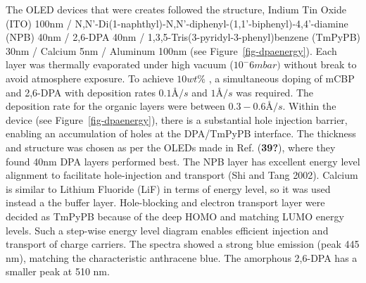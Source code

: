 \documentclass[
  letterpaper,
  DIV=11,
  numbers=noendperiod,
  oneside]{scrreprt}
\begin{document}
The OLED devices that were creates followed the structure, Indium Tin
Oxide (ITO) 100nm /
N,N'-Di(1-naphthyl)-N,N'-diphenyl-(1,1'-biphenyl)-4,4'-diamine (NPB)
40nm / 2,6-DPA 40nm / 1,3,5-Tris(3-pyridyl-3-phenyl)benzene (TmPyPB)
30nm / Calcium 5nm / Aluminum 100nm (see Figure~\ref{fig-dpaenergy}).
Each layer was thermally evaporated under high vacuum (\(10^-6 mbar)\)
without break to avoid atmosphere exposure. To achieve \(10wt\%\) , a
simultaneous doping of mCBP and 2,6-DPA with deposition rates \(0.1Å/s\)
and \(1Å/s\) was required. The deposition rate for the organic layers
were between \(0.3 - 0.6Å/s\). Within the device (see
Figure~\ref{fig-dpaenergy}), there is a substantial hole injection
barrier, enabling an accumulation of holes at the DPA/TmPyPB interface.
The thickness and structure was chosen as per the OLEDs made in Ref.
(\textbf{39?}), where they found 40nm DPA layers performed best. The NPB
layer has excellent energy level alignment to facilitate hole-injection
and transport (Shi and Tang 2002). Calcium is similar to Lithium
Fluoride (LiF) in terms of energy level, so it was used instead a the
buffer layer. Hole-blocking and electron transport layer were decided as
TmPyPB because of the deep HOMO and matching LUMO energy levels. Such a
step-wise energy level diagram enables efficient injection and transport
of charge carriers. The spectra showed a strong blue emission (peak 445
nm), matching the characteristic anthracene blue. The amorphous 2,6-DPA
has a smaller peak at 510 nm.
\end{document}
